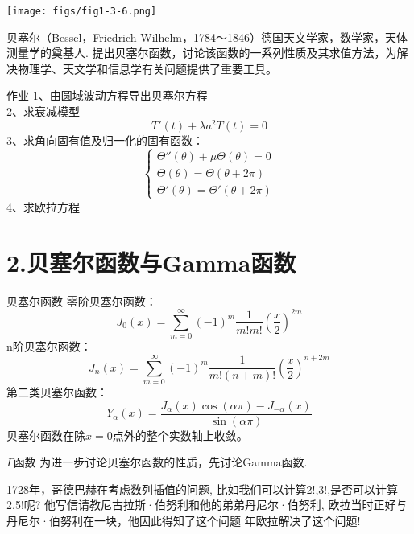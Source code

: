 \newpage	
	\begin{center}
			\texttt{[image: figs/fig1-3-6.png]}	
	\end{center}


	贝塞尔（Bessel，Friedrich Wilhelm，1784～1846）德国天文学家，数学家，天体测量学的奠基人.
	提出贝塞尔函数，讨论该函数的一系列性质及其求值方法，为解决物理学、天文学和信息学有关问题提供了重要工具。



	{作业}
	1、由圆域波动方程导出贝塞尔方程\\
	2、求衰减模型
	\begin{equation*}
		T'(t)+\lambda a^2T(t)=0  
	\end{equation*}
	3、求角向固有值及归一化的固有函数：\\
	\[ \begin{cases}
		\Theta ''(\theta)+\mu \Theta (\theta) =0 \\
		\Theta (\theta) =	\Theta (\theta+2\pi)  \\
		\Theta' (\theta) =	\Theta' (\theta+2\pi)  
	\end{cases}  \]	
	4、求欧拉方程


\section{2.贝塞尔函数与Gamma函数}


	{贝塞尔函数}
	零阶贝塞尔函数：
	\begin{equation*}
		J_0(x) = \sum\limits_{m=0}^{\infty} (-1)^m  \frac{1}{m! m! } (\frac{x}{2})^{2m} 
	\end{equation*}	
	n阶贝塞尔函数：
	\begin{equation*}
		J_n(x) = \sum\limits_{m=0}^{\infty} (-1)^m  \frac{1}{m! (n+m) ! } (\frac{x}{2})^{n+2m} 
	\end{equation*}	
	第二类贝塞尔函数：
	\begin{equation*}
		Y_{\alpha}(x)=\frac{J_{\alpha}(x) \cos (\alpha \pi)-J_{-\alpha}(x)}{\sin (\alpha \pi)}
	\end{equation*}	
	贝塞尔函数在除$x=0$点外的整个实数轴上收敛。



	{$\Gamma$函数}
	为进一步讨论贝塞尔函数的性质，先讨论Gamma函数.\\  
	\begin{enumerate}
		\Item 1728年，哥德巴赫在考虑数列插值的问题, 比如我们可以计算2!,3!,是否可以计算2.5!呢? 
		\Item 他写信请教尼古拉斯·伯努利和他的弟弟丹尼尔·伯努利, 欧拉当时正好与丹尼尔·伯努利在一块，他因此得知了这个问题
		 年欧拉解决了这个问题! 
	\end{enumerate}
	\begin{figure}
		\centering
	\end{figure} 
	\setcounter{subfigure}{0}



